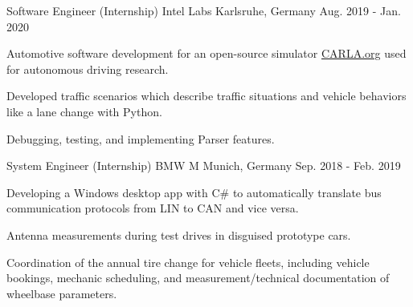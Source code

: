 \begin{cventries}
  \cventry
    {Software Engineer (Internship)}
    {Intel Labs}
    {Karlsruhe, Germany}
    {Aug. 2019 - Jan. 2020}
    {
      \begin{cvitems}
      \item Automotive software development for an open-source simulator 
{\hypersetup{urlcolor=black}\href{https://carla.org/}{CARLA.org}} used for autonomous driving research.
    \item Developed traffic scenarios which describe traffic situations and vehicle behaviors like a lane change with Python.
    \item Debugging, testing, and implementing Parser features.
      \end{cvitems}
    }

  \cventry
    {System Engineer (Internship)}
    {BMW M}
    {Munich, Germany}
    {Sep. 2018 - Feb. 2019}
    {
      \begin{cvitems}
        \item Developing a Windows desktop app with C\# to automatically translate bus communication protocols from LIN to CAN and vice versa.
    \item Antenna measurements during test drives in disguised prototype cars.
    \item Coordination of the annual tire change for vehicle fleets, including vehicle bookings, mechanic scheduling, and measurement/technical documentation of wheelbase parameters.
      \end{cvitems}
    }
\end{cventries}
